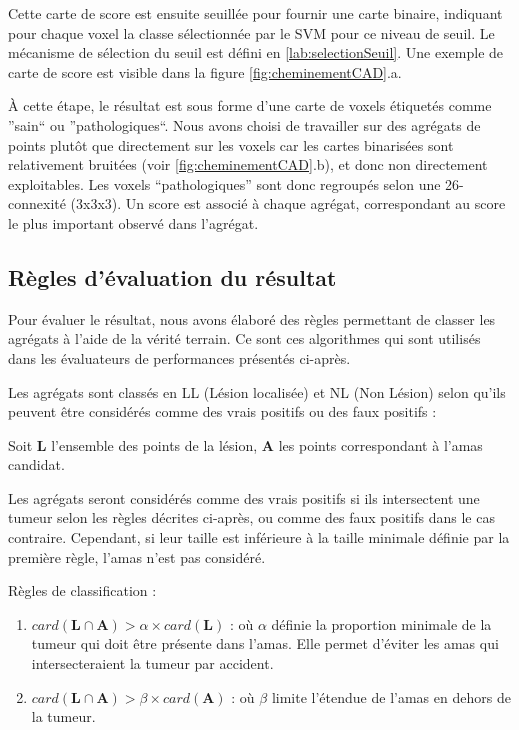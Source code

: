 Cette carte de score est ensuite seuillée pour fournir une carte binaire, indiquant pour chaque voxel la classe sélectionnée par le SVM pour ce niveau de seuil. Le mécanisme de sélection du seuil est défini en \ref{lab:selectionSeuil}. Une exemple de carte de score est visible dans la figure \ref{fig:cheminementCAD}.a.
	
\`A cette étape, le résultat est sous forme d'une carte de voxels étiquetés comme ''sain`` ou ''pathologiques``. Nous avons choisi de travailler sur des agrégats de points plutôt que directement sur les voxels car les cartes binarisées sont relativement bruitées (voir \ref{fig:cheminementCAD}.b), et donc non directement exploitables. Les voxels ``pathologiques'' sont donc regroupés selon une 26-connexité (3x3x3). Un score est associé à chaque  agrégat, correspondant au score le plus important observé dans l'agrégat.

\subsection{Règles d'évaluation du résultat}
\label{lab:reglesSelect}
Pour évaluer le résultat, nous avons élaboré des règles permettant de classer les agrégats à l'aide de la vérité terrain. Ce sont ces algorithmes qui sont utilisés dans les évaluateurs de performances présentés ci-après.

Les agrégats sont classés en LL (Lésion localisée) et NL (Non Lésion) selon qu'ils peuvent être considérés comme des vrais positifs ou des faux positifs :

Soit $\mathbf{L}$ l'ensemble des points de la lésion, $\mathbf{A}$ les points correspondant à l'amas candidat.

Les agrégats seront considérés comme des vrais positifs si ils intersectent une tumeur selon les règles décrites ci-après, ou comme des faux positifs dans le cas contraire. Cependant, si leur taille est inférieure à la taille minimale définie par la première règle, l'amas n'est pas considéré.

Règles de classification :
\begin{enumerate}
 \item $card( \mathbf{L} \cap \mathbf{A} ) > \alpha \times card( \mathbf{L} )$ : où $\alpha$ définie la proportion minimale de la tumeur qui doit être présente dans l'amas. Elle permet d'éviter les amas qui intersecteraient la tumeur par accident.
 \item $card( \mathbf{L} \cap \mathbf{A} ) > \beta \times card( \mathbf{A} )$ : où $\beta$ limite l'étendue de l'amas en dehors de la tumeur.
\end{enumerate}

